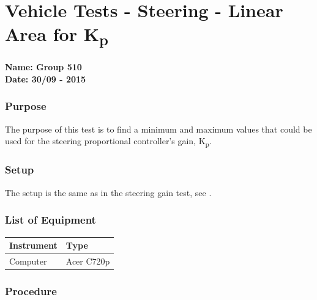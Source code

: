 \pagebreak
\section{Vehicle Tests - Steering - Linear Area for \si{K_p}} \label{app:LinearAreaKp}
\textbf{Name: Group 510}\\
\textbf{Date: 30/09 - 2015}

\subsubsection{Purpose}
The purpose of this test is to find a minimum and maximum values that could be used for the steering proportional controller's gain, \si{K_p}.

\subsubsection{Setup}
The setup is the same as in the steering gain test, see .

\subsubsection{List of Equipment}

\begin{table}[H]
\begin{tabular}{|p{10cm}|p{4cm}|}
\hline%
  \textbf{Instrument}                     &  \textbf{Type}       \\
\hline%
  Computer                                &  Acer C720p    \\
\hline %
\end{tabular}
\end{table}

\subsubsection{Procedure}


